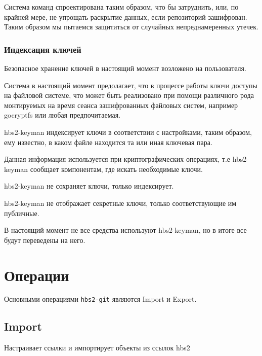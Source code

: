 \documentclass[11pt,a4paper]{article}
\begin{document}
Система команд спроектирована таким образом, что бы затруднить, или, по крайней мере, не упрощать
раскрытие данных, если репозиторий зашифрован. Таким образом мы пытаемся защититься от случайных
непреднамеренных утечек.


\subsubsection*{Индексация ключей}

Безопасное хранение ключей в настоящий момент возложено на пользователя.

Система в настоящий момент предолагает, что в процессе работы ключи
доступы на файловой системе, что может быть реализовано при помощи
различного рода монтируемых на время сеанса зашифрованных файловых
систем, например gocryptfs или любая предпочитаемая.

hbs2-keyman индексирует ключи в соответствии с настройками, таким образом,
ему известно, в каком файле находится та или иная ключевая пара.

Данная информация используется при криптографических операциях, т.е
hbs2-keyman сообщает компонентам, где искать необходимые ключи.

hbs2-keyman не сохраняет ключи, только индексирует.

hbs2-keyman не отображает секретные ключи, только соответствующие им публичные.

В настоящий момент не все средства используют hbs2-keyman, но в итоге все
будут переведены на него.



\section{Операции}

Основными операциями \texttt{hbs2-git} являются Import и Export.

\subsection{Import}

Настраивает ссылки и импортирует объекты из ссылок hbs2
\end{document}

